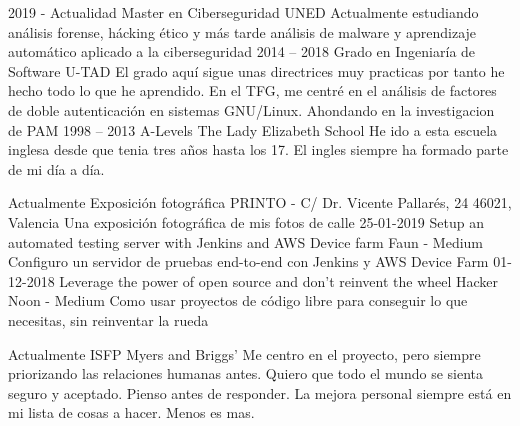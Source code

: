 \documentclass[9pt]{developercv} %
\begin{document}


\begin{entrylist}
	\entry
    {2019 - Actualidad}
    {Master en Ciberseguridad}
    {UNED}
    {Actualmente estudiando análisis forense, hácking ético y más tarde análisis de malware y aprendizaje automático aplicado a la ciberseguridad}
	\entry
		{2014 -- 2018}
		{Grado en Ingeniaría de Software}
		{U-TAD}
		{El grado aquí sigue unas directrices muy practicas por tanto he hecho todo lo que he aprendido.
		En el TFG, me centré en el análisis de factores de doble autenticación en sistemas GNU/Linux. Ahondando en la investigacion de PAM}
	\entry
		{1998 -- 2013}
		{A-Levels}
		{The Lady Elizabeth School}
    {He ido a esta escuela inglesa desde que tenia tres años hasta los 17. El ingles siempre ha formado parte de mi día a día.}
\end{entrylist}


\begin{entrylist}
  \entry
    {Actualmente}
    {Exposición fotográfica}
    {PRINTO - C/ Dr. Vicente Pallarés, 24 46021, Valencia}
    {Una exposición fotográfica de mis fotos de calle}
	\entry
		{25-01-2019}
		{Setup an automated testing server with Jenkins and AWS Device farm}
		{Faun - Medium}
		{Configuro un servidor de pruebas end-to-end con Jenkins y AWS Device Farm}
	\entry
		{01-12-2018}
		{Leverage the power of open source and don’t reinvent the wheel}
		{Hacker Noon - Medium}
    {Como usar proyectos de código libre para conseguir lo que necesitas, sin reinventar la rueda}
\end{entrylist}
\clearpage


\begin{entrylist}
	\entry
		{Actualmente}
		{ISFP}
		{Myers and Briggs'}
		{Me centro en el proyecto, pero siempre priorizando las relaciones humanas antes.
		Quiero que todo el mundo se sienta seguro y aceptado.
		Pienso antes de responder.
		La mejora personal siempre está en mi lista de cosas a hacer.
		Menos es mas.}
\end{entrylist}
\end{document}
